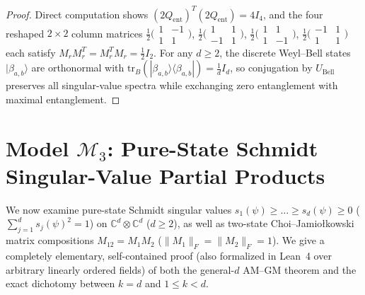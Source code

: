 \documentclass[11pt,a4paper]{article}
\theoremstyle{plain}
\theoremstyle{definition}
\newcommand{\C}{\mathbb{C}}
\newcommand{\tr}{\mathrm{tr}}
\begin{document}
\begin{proof}
Direct computation shows $(2 Q_{\mathrm{ent}})^T (2 Q_{\mathrm{ent}}) = 4 I_4$, and the four reshaped $2 \times 2$ column matrices $\frac{1}{2}\bigl(\begin{smallmatrix}1 & -1\\ 1 & 1\end{smallmatrix}\bigr)$, $\frac{1}{2}\bigl(\begin{smallmatrix}1 & 1\\ -1 & 1\end{smallmatrix}\bigr)$, $\frac{1}{2}\bigl(\begin{smallmatrix}1 & 1\\ 1 & -1\end{smallmatrix}\bigr)$, $\frac{1}{2}\bigl(\begin{smallmatrix}-1 & 1\\ 1 & 1\end{smallmatrix}\bigr)$ each satisfy $M_r M_r^T = M_r^T M_r = \frac{1}{2} I_2$. For any $d \ge 2$, the discrete Weyl--Bell states $|\beta_{a,b}\rangle$ are orthonormal with $\tr_B(|\beta_{a,b}\rangle\langle\beta_{a,b}|) = \frac{1}{d} I_d$, so conjugation by $U_{\mathrm{Bell}}$ preserves all singular-value spectra while exchanging zero entanglement with maximal entanglement.
\end{proof}

\section{Model \texorpdfstring{$\mathcal{M}_3$}{M3}: Pure-State Schmidt Singular-Value Partial Products}

We now examine pure-state Schmidt singular values $s_1(\psi) \ge \dots \ge s_d(\psi) \ge 0$ ($\sum_{j=1}^d s_j(\psi)^2 = 1$) on $\C^d \otimes \C^d$ ($d \ge 2$), as well as two-state Choi--Jamio\l kowski matrix compositions $M_{12} = M_1 M_2$ ($\|M_1\|_F = \|M_2\|_F = 1$). We give a completely elementary, self-contained proof (also formalized in Lean~4 over arbitrary linearly ordered fields) of both the general-$d$ AM--GM theorem and the exact dichotomy between $k = d$ and $1 \le k < d$.
\end{document}
